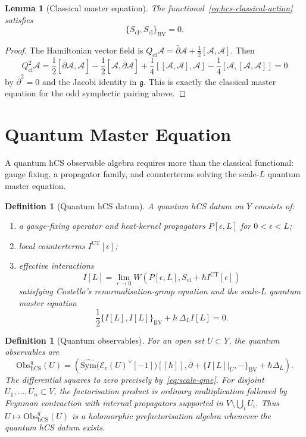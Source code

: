 \documentclass[11pt]{article}
\newtheorem{lemma}[theorem]{Lemma}
\newtheorem{definition}[theorem]{Definition}
\theoremstyle{remark}
\providecommand{\frakg}{\mathfrak{g}}
\providecommand{\Obs}{\mathrm{Obs}}
\providecommand{\dbar}{\bar{\partial}}
\providecommand{\hCS}{\mathrm{hCS}}
\providecommand{\Ecal}{\mathcal{E}}
\begin{document}
\begin{lemma}[Classical master equation]
\label{lem:cme}
The functional~\eqref{eq:hcs-classical-action} satisfies
\[
  \{S_{\mathrm{cl}},S_{\mathrm{cl}}\}_{\mathrm{BV}}=0 .
\]
\end{lemma}

\begin{proof}
The Hamiltonian vector field is
$Q_{\mathrm{cl}}\mathcal A=\dbar\mathcal A+\frac12[\mathcal A,\mathcal A]$.
Then
\[
  Q_{\mathrm{cl}}^2\mathcal A
  =
  \frac12[\dbar\mathcal A,\mathcal A]
  -\frac12[\mathcal A,\dbar\mathcal A]
  +\frac14[[\mathcal A,\mathcal A],\mathcal A]
  -\frac14[\mathcal A,[\mathcal A,\mathcal A]]
  =0
\]
by $\dbar^2=0$ and the Jacobi identity in $\frakg$.  This is exactly
the classical master equation for the odd symplectic pairing above.
\end{proof}

\section{Quantum Master Equation}

A quantum hCS observable algebra requires more than the classical
functional: gauge fixing, a propagator family, and counterterms solving
the scale-$L$ quantum master equation.

\begin{definition}[Quantum hCS datum]
\label{def:quantum-hcs-datum}
A quantum hCS datum on $Y$ consists of:
\begin{enumerate}[label=\textup{(\roman*)}]
  \item a gauge-fixing operator and heat-kernel propagators
  $P[\epsilon,L]$ for $0<\epsilon<L$;
  \item local counterterms $I^{\mathrm{CT}}[\epsilon]$;
  \item effective interactions
  \[
    I[L]=
    \lim_{\epsilon\to0}
    W\!\left(P[\epsilon,L],
      S_{\mathrm{cl}}+\hbar I^{\mathrm{CT}}[\epsilon]\right)
  \]
  satisfying Costello's renormalisation-group equation and the
  scale-$L$ quantum master equation
  \[
    \frac12\{I[L],I[L]\}_{\mathrm{BV}}
    +\hbar\,\Delta_L I[L]=0 .
    \label{eq:scale-qme}
  \]
\end{enumerate}
\end{definition}

\begin{definition}[Quantum observables]
\label{def:quantum-observables}
For an open set $U\subset Y$, the quantum observables are
\[
  \Obs^q_{\hCS}(U)
  =
  \left(
    \widehat{\mathrm{Sym}}\bigl(\Ecal_c(U)^\vee[-1]\bigr)[[\hbar]],
    \dbar+\{I[L]|_U,-\}_{\mathrm{BV}}+\hbar\Delta_L
  \right).
  \label{eq:obs-q-hcs}
\]
The differential squares to zero precisely by~\eqref{eq:scale-qme}.
For disjoint $U_1,\ldots,U_n\subset V$, the factorisation product is
ordinary multiplication followed by Feynman contraction with internal
propagators supported in $V\setminus\bigcup_i U_i$.  Thus
$U\mapsto\Obs^q_{\hCS}(U)$ is a holomorphic prefactorisation algebra
whenever the quantum hCS datum exists.
\end{definition}
\end{document}
